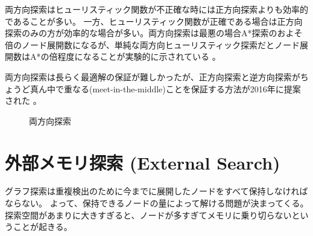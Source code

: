 両方向探索はヒューリスティック関数が不正確な時には正方向探索よりも効率的であることが多い\cite{barker2015limitations}。
一方、ヒューリスティック関数が正確である場合は正方向探索のみの方が効率的な場合が多い。両方向探索は最悪の場合A*探索のおよそ倍のノード展開数になるが、単純な両方向ヒューリスティック探索だとノード展開数はA*の倍程度になることが実験的に示されている \cite{barker2015limitations}。

両方向探索は長らく最適解の保証が難しかったが、正方向探索と逆方向探索がちょうど真ん中で重なる(meet-in-the-middle)ことを保証する方法が2016年に提案された \cite{holte2016bidirectional}。

\begin{figure}
  \centering
  \scalebox{0.75}{
  \begin{tikzpicture}[scale=0.6]
    
  \end{tikzpicture}
  }
  \caption{両方向探索}
  \label{fig:bidirectional}
\end{figure}


% 



\section{外部メモリ探索 (External Search)}
\label{sec:external-search}


グラフ探索は重複検出のために今までに展開したノードをすべて保持しなければならない。
よって、保持できるノードの量によって解ける問題が決まってくる。
探索空間があまりに大きすぎると、ノードが多すぎてメモリに乗り切らないということが起きる。

